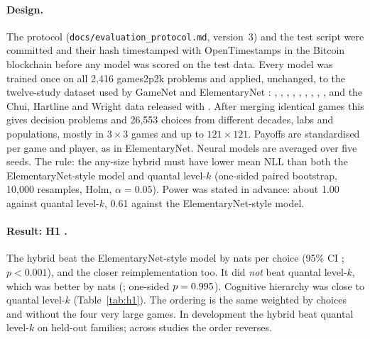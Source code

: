 \documentclass[11pt]{article}
\begin{document}
\paragraph{Design.} The protocol (\texttt{docs/evaluation\_protocol.md}, version~3) and the test
script were committed and their hash timestamped with OpenTimestamps in the Bitcoin blockchain
before any model was scored on the test data. Every model was trained once on all 2,416 games2p2k
problems and applied, unchanged, to the twelve-study dataset used by GameNet and ElementaryNet
\citep{hartford2016deep,deon2026elementarynet}: \citet{stahl1994experimental,stahl1995players},
\citet{costagomes2001cognition}, \citet{goeree2001ten}, \citet{cooper2003evidence},
\citet{haruvy2001modeling}, \citet{haruvy2007equilibrium}, \citet{stahl2008level},
\citet{rogers2009heterogeneous}, \citet{costagomes2008stated}, \citet{fudenberg2019initial} and
the Chui, Hartline and Wright data released with \citet{deon2026elementarynet}. After merging
identical games this gives \hOneProblems{} decision problems and 26,553 choices from different
decades, labs and populations, mostly in $3\times3$ games and up to $121\times121$. Payoffs are
standardised per game and player, as in ElementaryNet. Neural models are averaged over five seeds.
The rule: the any-size hybrid must have lower mean NLL than both the ElementaryNet-style model and
quantal level-$k$ (one-sided paired bootstrap, 10,000 resamples, Holm, $\alpha=0.05$). Power was
stated in advance: about 1.00 against quantal level-$k$, 0.61 against the ElementaryNet-style model.

\paragraph{Result: H1 \hOneVerdict.} The hybrid beat the ElementaryNet-style model by
\hOneDiffElem{} nats per choice (95\% CI \hOneCiElem; $p<0.001$), and the closer reimplementation
too. It did \emph{not} beat quantal level-$k$, which was better by \hOneDiffQLk{} nats
(\hOneCiQLk; one-sided $p=0.995$). Cognitive hierarchy was close to quantal level-$k$
(Table~\ref{tab:h1}). The ordering is the same weighted by choices and without the four very large
games. In development the hybrid beat quantal level-$k$ on held-out families; across studies the
order reverses.

\begin{table}[t]
\centering\small
\resizebox{\linewidth}{!}{}
\caption{Confirmatory transfer test: trained on games2p2k, tested on \hOneProblems{} problems from
twelve other studies. NLL in nats per choice. Last column: paired difference on identical problems;
negative means the hybrid is better.}
\label{tab:h1}
\end{table}
\end{document}
